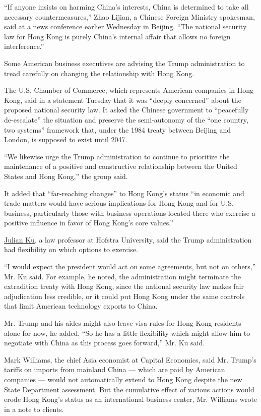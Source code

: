 ``If anyone insists on harming China's interests, China is determined to
take all necessary countermeasures,'' Zhao Lijian, a Chinese Foreign
Ministry spokesman, said at a news conference earlier Wednesday in
Beijing. ``The national security law for Hong Kong is purely China's
internal affair that allows no foreign interference.''

Some American business executives are advising the Trump administration
to tread carefully on changing the relationship with Hong Kong.

The U.S. Chamber of Commerce, which represents American companies in
Hong Kong, said in a statement Tuesday that it was ``deeply concerned''
about the proposed national security law. It asked the Chinese
government to ``peacefully de-escalate'' the situation and preserve the
semi-autonomy of the ``one country, two systems'' framework that, under
the 1984 treaty between Beijing and London, is supposed to exist until
2047.

``We likewise urge the Trump administration to continue to prioritize
the maintenance of a positive and constructive relationship between the
United States and Hong Kong,'' the group said.

It added that ``far-reaching changes'' to Hong Kong's status ``in
economic and trade matters would have serious implications for Hong Kong
and for U.S. business, particularly those with business operations
located there who exercise a positive influence in favor of Hong Kong's
core values.''

\href{https://law.hofstra.edu/directory/faculty/fulltime/ku/}{Julian
Ku}, a law professor at Hofstra University, said the Trump
administration had flexibility on which options to exercise.

``I would expect the president would act on some agreements, but not on
others,'' Mr. Ku said. For example, he noted, the administration might
terminate the extradition treaty with Hong Kong, since the national
security law makes fair adjudication less credible, or it could put Hong
Kong under the same controls that limit American technology exports to
China.

Mr. Trump and his aides might also leave visa rules for Hong Kong
residents alone for now, he added. ``So he has a little flexibility
which might allow him to negotiate with China as this process goes
forward,'' Mr. Ku said.

Mark Williams, the chief Asia economist at Capital Economics, said Mr.
Trump's tariffs on imports from mainland China --- which are paid by
American companies --- would not automatically extend to Hong Kong
despite the new State Department assessment. But the cumulative effect
of various actions would erode Hong Kong's status as an international
business center, Mr. Williams wrote in a note to clients.

